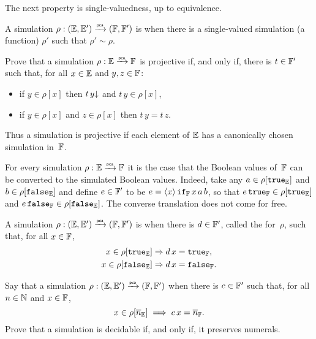 The next property is single-valuedness, up to equivalence.

\begin{definition}
  A simulation $\rho: ({\mathbb{E}}, {\mathbb{E}'}) \xrightarrow{\scriptscriptstyle\mathsf{pca}}{} ({\mathbb{F}}, {\mathbb{F}'})$ is
   when there is a single-valued simulation (a function) $\rho'$ such that $\rho' \sim \rho$.
\end{definition}

\begin{exercise}
  Prove that a simulation $\rho : {\mathbb{E}} \xrightarrow{\scriptscriptstyle\mathsf{pca}}{} {\mathbb{F}}$ is projective if, and only if,
  there is $t \in {\mathbb{F}'}$ such that, for all $x \in {\mathbb{E}}$ and $y, z \in {\mathbb{F}}$:
  \begin{itemize}
  \item if $y \in \rho[x]$ then $t\,y{\downarrow}$ and $t\,y \in \rho[x]$,
  \item if $y \in \rho[x]$ and $z \in \rho[x]$ then $t \, y = t \, z$.
  \end{itemize}
  Thus a simulation is projective if each element of ${\mathbb{E}}$ has a canonically chosen simulation in~${\mathbb{F}}$.
\end{exercise}


For every simulation $\rho : {\mathbb{E}} \xrightarrow{\scriptscriptstyle\mathsf{pca}}{} {\mathbb{F}}$ it is the case that the Boolean values of~${\mathbb{F}}$ can be converted to the simulated Boolean values. Indeed, take any $a \in \rho[\mathtt{true}_{\mathbb{E}}]$ and $b \in \rho[\mathtt{false}_{\mathbb{E}}]$ and define $e \in {\mathbb{F}}'$ to be
$e = \langle x \rangle\, \mathtt{if}_{\mathbb{F}} \, x \, a \, b$, so that $e \, \mathtt{true}_{\mathbb{F}} \in \rho[\mathtt{true}_{\mathbb{E}}]$ and $e \, \mathtt{false}_{\mathbb{F}} \in \rho[\mathtt{false}_{\mathbb{E}}]$. The converse translation does not come for free.

\begin{definition}
  A simulation $\rho: ({\mathbb{E}}, {\mathbb{E}'}) \xrightarrow{\scriptscriptstyle\mathsf{pca}}{} ({\mathbb{F}}, {\mathbb{F}'})$ is
   when there is $d \in {\mathbb{F}'}$,
  called the
   for~$\rho$, such that, for all $x \in {\mathbb{F}}$,
  \begin{align*}
    x \in \rho[\mathtt{true}_{\mathbb{E}}] &\Rightarrow d \, x = \mathtt{true}_{\mathbb{F}},
    \\
    x \in \rho[\mathtt{false}_{\mathbb{E}}] &\Rightarrow d \, x = \mathtt{false}_{\mathbb{F}}.
  \end{align*}
\end{definition}

\begin{exercise}
  \label{exc:simulation-numerals}%
  Say that a simulation $\rho: ({\mathbb{E}}, {\mathbb{E}'}) \xrightarrow{\scriptscriptstyle\mathsf{pca}}{} ({\mathbb{F}}, {\mathbb{F}'})$ 
  when there is $c \in {\mathbb{F}'}$ such that, for all $n \in \mathbb{N}$ and $x \in {\mathbb{F}}$,
  \begin{equation*}
    x \in \rho[\overline{n}_{\mathbb{E}}] \implies c \, x = \overline{n}_{\mathbb{F}}.
  \end{equation*}
  Prove that a simulation is decidable if, and only if, it preserves numerals.
\end{exercise}


